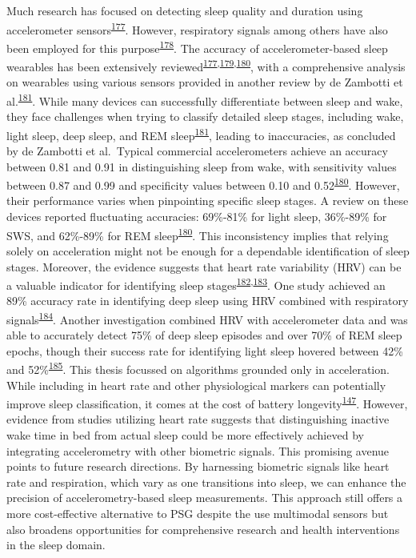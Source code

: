 \documentclass[
  10pt,
]{scrbook}
\begin{document}
Much research has focused on detecting sleep quality and duration using
accelerometer
sensors\textsuperscript{\protect\hyperlink{ref-baron_2018}{177}}.
However, respiratory signals among others have also been employed for
this purpose\textsuperscript{\protect\hyperlink{ref-dunn_2018}{178}}.
The accuracy of accelerometer-based sleep wearables has been extensively
reviewed\textsuperscript{\protect\hyperlink{ref-baron_2018}{177},\protect\hyperlink{ref-danzig_2020}{179},\protect\hyperlink{ref-haghayegh_2019}{180}},
with a comprehensive analysis on wearables using various sensors
provided in another review by de Zambotti et
al.\textsuperscript{\protect\hyperlink{ref-dezambotti_2019}{181}}. While
many devices can successfully differentiate between sleep and wake, they
face challenges when trying to classify detailed sleep stages, including
wake, light sleep, deep sleep, and REM
sleep\textsuperscript{\protect\hyperlink{ref-dezambotti_2019}{181}},
leading to inaccuracies, as concluded by de Zambotti et al.~Typical
commercial accelerometers achieve an accuracy between 0.81 and 0.91 in
distinguishing sleep from wake, with sensitivity values between 0.87 and
0.99 and specificity values between 0.10 and
0.52\textsuperscript{\protect\hyperlink{ref-haghayegh_2019}{180}}.
However, their performance varies when pinpointing specific sleep
stages. A review on these devices reported fluctuating accuracies:
69\%-81\% for light sleep, 36\%-89\% for SWS, and 62\%-89\% for REM
sleep\textsuperscript{\protect\hyperlink{ref-haghayegh_2019}{180}}. This
inconsistency implies that relying solely on acceleration might not be
enough for a dependable identification of sleep stages. Moreover, the
evidence suggests that heart rate variability (HRV) can be a valuable
indicator for identifying sleep
stages\textsuperscript{\protect\hyperlink{ref-herzig_2018}{182},\protect\hyperlink{ref-chouchou_2014}{183}}.
One study achieved an 89\% accuracy rate in identifying deep sleep using
HRV combined with respiratory
signals\textsuperscript{\protect\hyperlink{ref-long_2017}{184}}. Another
investigation combined HRV with accelerometer data and was able to
accurately detect 75\% of deep sleep episodes and over 70\% of REM sleep
epochs, though their success rate for identifying light sleep hovered
between 42\% and
52\%\textsuperscript{\protect\hyperlink{ref-muzet_2016}{185}}. This
thesis focussed on algorithms grounded only in acceleration. While
including in heart rate and other physiological markers can potentially
improve sleep classification, it comes at the cost of battery
longevity\textsuperscript{\protect\hyperlink{ref-walch_sleep_2019}{147}}.
However, evidence from studies utilizing heart rate suggests that
distinguishing inactive wake time in bed from actual sleep could be more
effectively achieved by integrating accelerometry with other biometric
signals. This promising avenue points to future research directions. By
harnessing biometric signals like heart rate and respiration, which vary
as one transitions into sleep, we can enhance the precision of
accelerometry-based sleep measurements. This approach still offers a
more cost-effective alternative to PSG despite the use multimodal
sensors but also broadens opportunities for comprehensive research and
health interventions in the sleep domain.
\end{document}
